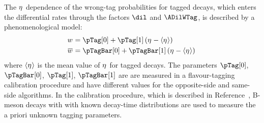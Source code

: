 The $\eta^{}$ dependence of the wrong-tag probabilities for tagged decays, which enters the differential rates through the factors $\dil$
and $\ADilWTag$, is described by a phenomenological model:
\begin{subequations}
  \begin{align}
    \wTag    &= \pTag[0]    + \pTag[1]\,    (\etaTag-\langle\etaTag\rangle) \\
    \wTagBar &= \pTagBar[0] + \pTagBar[1]\, (\etaTag-\langle\etaTag\rangle) \,
  \end{align}
\end{subequations}
where $\langle\eta^{}\rangle$ is the mean value of $\eta^{}$ for tagged decays. The parameters $\pTag[0]$, $\pTagBar[0]$, $\pTag[1]$,
$\pTagBar[1]$ are are measured in a flavour-tagging calibration procedure and have different values for the opposite-side and same-side
algorithms. In the calibration procedure, which is described in Reference~\cite{LHCb-ANA-2014-039}, B-meson decays with with known
decay-time distributions are used to measure the a priori unknown tagging parameters. 

